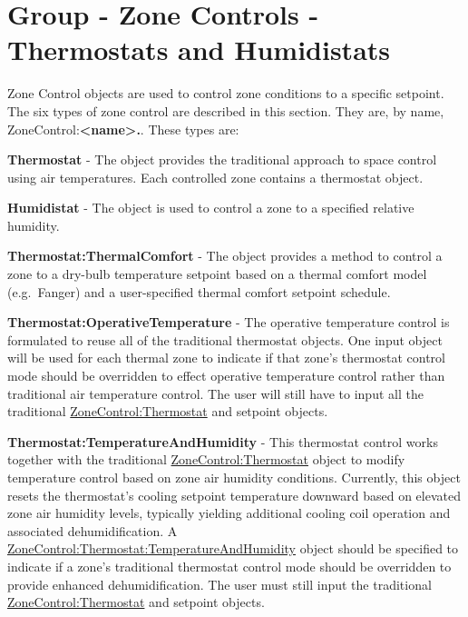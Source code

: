 \section{Group - Zone Controls - Thermostats and Humidistats}\label{group-zone-controls-thermostats}

Zone Control objects are used to control zone conditions to a specific setpoint. The six types of zone control are described in this section. They are, by name, ZoneControl:\textbf{\textless{}name\textgreater{}.}. These types are:

\textbf{Thermostat} - The object provides the traditional approach to space control using air temperatures. Each controlled zone contains a thermostat object.

\textbf{Humidistat} - The object is used to control a zone to a specified relative humidity.

\textbf{Thermostat:ThermalComfort} - The object provides a method to control a zone to a dry-bulb temperature setpoint based on a thermal comfort model (e.g.~Fanger) and a user-specified thermal comfort setpoint schedule.

\textbf{Thermostat:OperativeTemperature} - The operative temperature control is formulated to reuse all of the traditional thermostat objects. One input object will be used for each thermal zone to indicate if that zone's thermostat control mode should be overridden to effect operative temperature control rather than traditional air temperature control. The user will still have to input all the traditional \hyperref[zonecontrolthermostat]{ZoneControl:Thermostat} and setpoint objects.

\textbf{Thermostat:TemperatureAndHumidity} - This thermostat control works together with the traditional \hyperref[zonecontrolthermostat]{ZoneControl:Thermostat} object to modify temperature control based on zone air humidity conditions. Currently, this object resets the thermostat's cooling setpoint temperature downward based on elevated zone air humidity levels, typically yielding additional cooling coil operation and associated dehumidification. A \hyperref[zonecontrolthermostattemperatureandhumidity]{ZoneControl:Thermostat:TemperatureAndHumidity} object should be specified to indicate if a zone's traditional thermostat control mode should be overridden to provide enhanced dehumidification. The user must still input the traditional \hyperref[zonecontrolthermostat]{ZoneControl:Thermostat} and setpoint objects.

